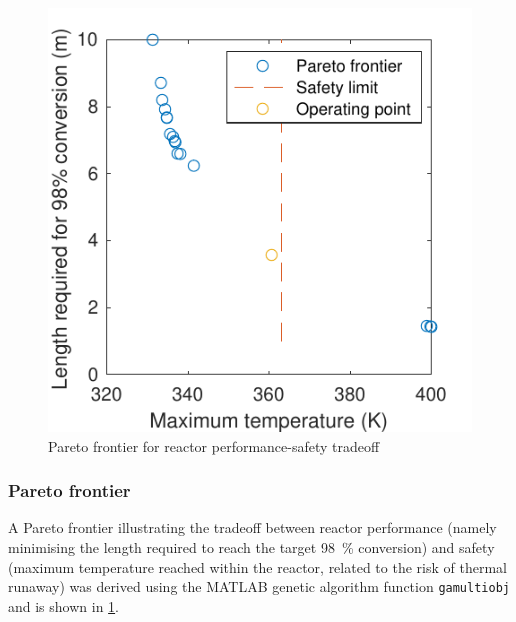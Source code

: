 \begin{figure}[h]
\begin{minipage}{0.49\linewidth}
        \includegraphics{figures/comsol-pareto.pdf}
        \caption{Pareto frontier for reactor performance-safety tradeoff}
        \label{fig:comsol-pareto}
    \end{minipage}
\end{figure}

\subsubsection{Pareto frontier}

A Pareto frontier illustrating the tradeoff between reactor performance (namely minimising the length required to reach the target \SI{98}{\percent} conversion) and safety (maximum temperature reached within the reactor, related to the risk of thermal runaway) was derived using the MATLAB genetic algorithm function \texttt{gamultiobj} and is shown in \cref{fig:comsol-pareto}.

